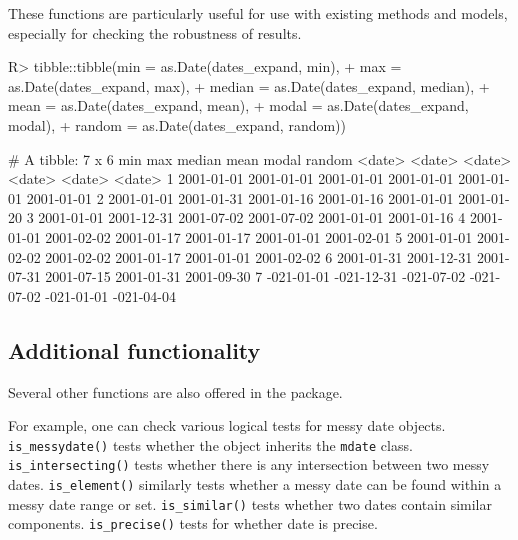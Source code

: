 \documentclass[
]{jss}
\begin{document}
These functions are particularly useful for use with existing methods
and models, especially for checking the robustness of results.

\begin{CodeChunk}
\begin{CodeInput}
R> tibble::tibble(min = as.Date(dates_expand, min),
+                max = as.Date(dates_expand, max),
+                median = as.Date(dates_expand, median),
+                mean = as.Date(dates_expand, mean),
+                modal = as.Date(dates_expand, modal),
+                random = as.Date(dates_expand, random))
\end{CodeInput}
\begin{CodeOutput}
# A tibble: 7 x 6
  min        max        median     mean       modal      random    
  <date>     <date>     <date>     <date>     <date>     <date>    
1 2001-01-01 2001-01-01 2001-01-01 2001-01-01 2001-01-01 2001-01-01
2 2001-01-01 2001-01-31 2001-01-16 2001-01-16 2001-01-01 2001-01-20
3 2001-01-01 2001-12-31 2001-07-02 2001-07-02 2001-01-01 2001-01-16
4 2001-01-01 2001-02-02 2001-01-17 2001-01-17 2001-01-01 2001-02-01
5 2001-01-01 2001-02-02 2001-02-02 2001-01-17 2001-01-01 2001-02-02
6 2001-01-31 2001-12-31 2001-07-31 2001-07-15 2001-01-31 2001-09-30
7 -021-01-01 -021-12-31 -021-07-02 -021-07-02 -021-01-01 -021-04-04
\end{CodeOutput}
\end{CodeChunk}

\hypertarget{additional-functionality}{%
\subsection{Additional functionality}\label{additional-functionality}}

Several other functions are also offered in the 
package.

For example, one can check various logical tests for messy date objects.
\texttt{is\_messydate()} tests whether the object inherits the
\texttt{mdate} class. \texttt{is\_intersecting()} tests whether there is
any intersection between two messy dates. \texttt{is\_element()}
similarly tests whether a messy date can be found within a messy date
range or set. \texttt{is\_similar()} tests whether two dates contain
similar components. \texttt{is\_precise()} tests for whether date is
precise.
\end{document}
